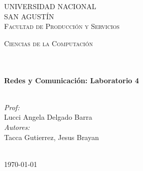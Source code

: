 \documentclass[11pt]{article}
\begin{document}
\begin{center}
\vspace*{-1.5cm}								%
\textsc{\huge UNIVERSIDAD NACIONAL\\ SAN AGUSTÍN \vspace{5px}}\\[1.5cm]	

\textsc{\LARGE Facultad de Producción y Servicios}\\[1.5cm]													%

\begin{minipage}{0.9\textwidth} 
\begin{center}																					%
\textsc{\LARGE Ciencias de la Computación}
\end{center}
\end{minipage}\\[0.5cm]
 			\vspace*{1cm}																		%
\HRule \\[0.4cm]																	%
{ \huge \bfseries Redes y Comunicación: Laboratorio 4}\\[0.4cm]	%
\HRule \\[1.5cm]																	%
\begin{minipage}{0.46\textwidth}													%
\begin{flushleft} \large															%


\emph{Prof:}\\	
Lucci Angela Delgado Barra
\\
\emph{Autores:}\\	
Tacca Gutierrez, Jesus Brayan \\ 
\
\end{flushleft}																		%
\end{minipage}		
\begin{minipage}{0.52\textwidth}		
\vspace{-0.6cm}											%
\end{minipage}	
\vspace*{1cm}
 	
\vspace{2cm} 																				
\begin{center}																					
{\large \today}																	%
 			\end{center}												  						
\end{center}							 											
																					
\end{document}
